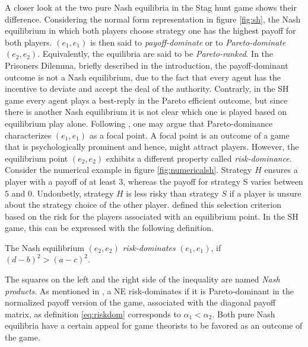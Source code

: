 A closer look at the two pure Nash equilibria in the Stag hunt game 
shows their difference. Considering the normal form representation in figure 
\ref{fig:sh}, the Nash equilibrium in which both players choose strategy one 
has the highest payoff
for both players. $(e_1,e_1)$ is then said to 
\textit{payoff-dominate} or to \textit{Pareto-dominate} 
$(e_2,e_2)$. Equivalently, the equilibria are said to be
\textit{Pareto-ranked}.
In the Prisoners Dilemma, briefly described in the introduction, 
the payoff-dominant outcome is not a 
Nash equilibrium, due to the fact that every agent has the incentive to 
deviate and accept the deal of the authority.
Contrarly, in the SH game every agent plays a best-reply 
in the Pareto efficient outcome, but since there is another Nash equilibrium 
it is not clear which one is played based on equilibrium play alone. 
Following \textcite[57]{schelling_strategy_1960}, one may argue that 
Pareto-dominance characterizes $(e_1,e_1)$ as a focal point. 
A focal point is an outcome of a game that is psychologically prominent and
hence, might attract players.
However, the equilibrium point $(e_2,e_2)$ exhibits a different property
called \textit{risk-dominance}. 
Consider the numerical example in figure \ref{fig:numericalsh}. 
Strategy $H$ ensures a player with a payoff of at least $3$, whereas the 
payoff for strategy S varies between $5$ and $0$. Undoubetly, 
strategy $H$ is less risky than strategy $S$ if a player is unsure 
about the strategy choice of the other player.
\textcite{harsanyi_general_1988} defined this selection criterion 
based on the risk for the players associated with an 
equilibrium point. In the SH game, this can be expressed with the following
definition.
\begin{mydef}
The Nash equilibrium $(e_2,e_2)$ \textit{risk-dominates} 
$(e_1,e_1)$, if $(d-b)^2 > (a-c)^2$. \label{eq:riskdom}
 \end{mydef}
The squares on the left and the right side of the inequality are named
\textit{Nash products}.
As mentioned in \textcite{weibull_evolutionary_1997}, a NE risk-dominates 
if it is Pareto-dominant in the normalized payoff version of the game, 
associated with the diagonal payoff matrix, 
as definition \eqref{eq:riskdom} corresponds to $\alpha_1 < \alpha_2$.
Both pure Nash equilibria have a certain appeal for game theorists to be
favored as an outcome of the game. 

